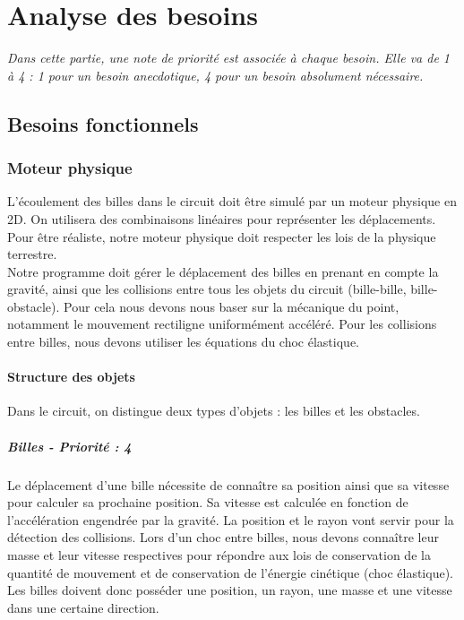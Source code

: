 \documentclass{report}
\begin{document}
\chapter{Analyse des besoins}

\textit{Dans cette partie, une note de priorité est associée à chaque besoin. Elle va de 1 à 4 : 1 pour un besoin anecdotique, 4 pour un besoin absolument nécessaire.}

\section{Besoins fonctionnels}

\subsection{Moteur physique}

L’écoulement des billes dans le circuit doit être simulé par un moteur physique en 2D. On utilisera des combinaisons linéaires pour représenter les déplacements. Pour être réaliste, notre moteur physique doit respecter les lois de la physique terrestre. \\

Notre programme doit gérer le déplacement des billes en prenant en compte la gravité, ainsi que les collisions entre tous les objets du circuit (bille-bille, bille-obstacle). Pour cela nous devons nous baser sur la mécanique du point, notamment le mouvement rectiligne uniformément accéléré. Pour les collisions entre billes, nous devons utiliser les équations du choc élastique. 


\subsubsection{Structure des objets}

Dans le circuit, on distingue deux types d’objets : les billes et les obstacles.


\paragraph{Billes - Priorité : 4}

Le déplacement d’une bille nécessite de connaître sa position ainsi que sa vitesse pour calculer sa prochaine position. Sa vitesse est calculée en fonction de l’accélération engendrée par la gravité. La position et le rayon vont servir pour la détection des collisions. Lors d’un choc entre billes, nous devons connaître leur masse et leur vitesse respectives pour répondre aux lois de conservation de la quantité de mouvement et de conservation de l’énergie cinétique (choc élastique). Les billes doivent donc posséder une position, un rayon, une masse et une vitesse dans une certaine direction.
\end{document}
